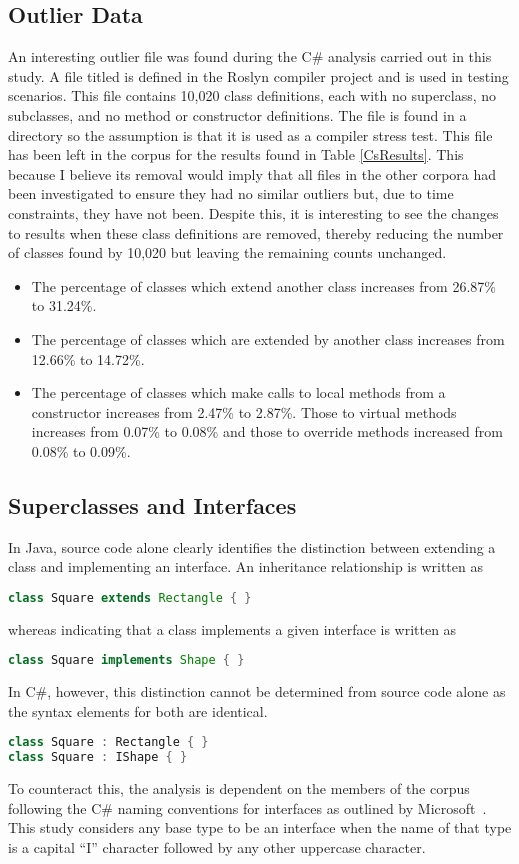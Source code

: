 \subsection{Outlier Data}
An interesting outlier file was found during the C\# analysis carried out in this study. A file titled  is defined in the Roslyn compiler project and is used in testing scenarios. This file contains 10,020 class definitions, each with no superclass, no subclasses, and no method or constructor definitions. The file is found in a  directory so the assumption is that it is used as a compiler stress test. This file has been left in the corpus for the results found in Table \ref{CsResults}. This because I believe its removal would imply that all files in the other corpora had been investigated to ensure they had no similar outliers but, due to time constraints, they have not been. Despite this, it is interesting to see the changes to results when these class definitions are removed, thereby reducing the number of classes found by 10,020 but leaving the remaining counts unchanged.
\begin{itemize}
	\item The percentage of classes which extend another class increases from 26.87\% to 31.24\%.
	\item The percentage of classes which are extended by another class increases from 12.66\% to 14.72\%.
	\item The percentage of classes which make calls to local methods from a constructor increases from 2.47\% to 2.87\%. Those to virtual methods increases from 0.07\% to 0.08\% and those to override methods increased from 0.08\% to 0.09\%.
\end{itemize}

\subsection{Superclasses and Interfaces}
\label{interfaceNaming}
In Java, source code alone clearly identifies the distinction between extending a class and implementing an interface. An inheritance relationship is written as
\begin{lstlisting}[language=java]
class Square extends Rectangle { }
\end{lstlisting}
whereas indicating that a class implements a given interface is written as
\begin{lstlisting}[language=java]
class Square implements Shape { }
\end{lstlisting}
In C\#, however, this distinction cannot be determined from source code alone as the syntax elements for both are identical.
\begin{lstlisting}[language=cs]
class Square : Rectangle { }
class Square : IShape { }
\end{lstlisting}
To counteract this, the analysis is dependent on the members of the corpus following the C\# naming conventions for interfaces as outlined by Microsoft~\cite{InterfaceNaming}. This study considers any base type to be an interface when the name of that type is a capital ``I'' character followed by any other uppercase character.

